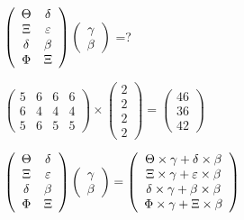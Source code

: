 \documentclass[12pt]{article}
\begin{document}
 
$  %
 \left( \begin{array}
 {
 c
 c
 }
 \Theta & 
 \delta \\ 
                    \Xi & 
 \varepsilon \\ 
 \delta & 
 \beta \\ 
 \Phi & 
                    \Xi
 \end{array} \right)
 \left( \begin{array}
 {
 c
 }
 \gamma \\ 
 \beta
 \end{array} \right)
$ =?
 
 
 
\noindent{}
 
 

 
$\left( \begin{array}{ccccccccccccccc}
           5  & 
           6  & 
           6  & 
           6  \\ 
           6  & 
           4  & 
           4  & 
           4  \\ 
           5  & 
           6  & 
           5  & 
           5
\end{array}\right) \times
\left( \begin{array}{c}
           2  \\ 
           2  \\ 
           2  \\ 
           2
\end{array}\right)  =
\left( \begin{array}{c}
          46  \\ 
          36  \\ 
          42
\end{array}\right)  $
 
$  %
 \left( \begin{array}
 {
 c
 c
 }
 \Theta & 
 \delta \\ 
                    \Xi & 
 \varepsilon \\ 
 \delta & 
 \beta \\ 
 \Phi & 
                    \Xi
 \end{array} \right)
 \left( \begin{array}
 {
 c
 }
 \gamma \\ 
 \beta
 \end{array} \right)
=
 \left( \begin{array}
 {
 c
 }
  \Theta \times  \gamma +  \delta \times  \beta \\ 
                     \Xi \times  \gamma +  \varepsilon \times  \beta \\ 
  \delta \times  \gamma +  \beta \times  \beta \\ 
  \Phi \times  \gamma +                     \Xi \times  \beta
 \end{array} \right)
$
 
\end{document}

